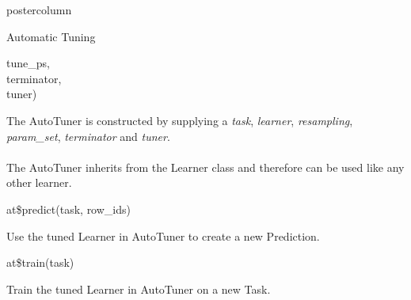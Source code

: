 \documentclass{beamer}
\begin{document}
\begin{frame}[fragile]{}
\begin{columns}
\begin{column}{.245\textwidth}
\begin{beamercolorbox}[center]{postercolumn}
\begin{minipage}{.98\textwidth}
{\begin{myblock}{Automatic Tuning}
\begin{codeboxmultiline}[width=18cm]
							\hspace*{1ex}tune\_ps,
\\
							\hspace*{1ex}terminator,
\\
							\hspace*{1ex}tuner)
						\end{codeboxmultiline}
						The AutoTuner is constructed by supplying a \textit{task}, \textit{learner}, \textit{resampling}, \textit{param\_set}, \textit{terminator} and \textit{tuner}. 
						\\
						\\
						The AutoTuner inherits from the Learner class and therefore can be used like any other learner.
						\\
						\begin{codebox}
							at\$predict(task, row\_ids)
						\end{codebox}
						Use the tuned Learner in AutoTuner to create a new Prediction.
						\\
						\begin{codebox}
							at\$train(task)
						\end{codebox}
						Train the tuned Learner in AutoTuner on a new Task.
						\end{myblock}
					\vfill}
				\end{minipage}
			\end{beamercolorbox}
		\end{column}
	\end{columns}
\end{frame}
\end{document}
